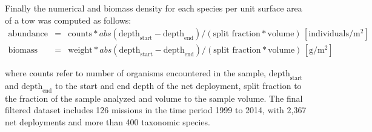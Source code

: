 \documentclass[letterpaper,portrait,11pt]{scrartcl}
\numberwithin{equation}{section}		%
\numberwithin{figure}{section}		%
\numberwithin{table}{section}				%
\begin{document}
\begin{appendices}
Finally the numerical and biomass density for each species per unit surface area of a tow was computed as follows: 
\begin{eqnarray*}
\text{abundance} &=& \text{counts} * abs( \text{depth}_{\text{start}} - \text{depth}_{\text{end}} ) / (\text{split fraction} * \text{volume}) \, [\text{individuals}/ \text{m}^{2} ]  \\
\text{biomass} &=& \text{weight} * abs( \text{depth}_{\text{start}} - \text{depth}_{\text{end}} ) / (\text{split fraction} * \text{volume}) \, [\text{g}/\text{m}^2]
\end{eqnarray*}

where counts refer to number of organisms encountered in the sample, $\text{depth}_{\text{start}}$ and $\text{depth}_{\text{end}}$ to the start and end depth of the net deployment, split fraction to the fraction of the sample analyzed and volume to the sample volume. The final filtered dataset includes 126 missions in the time period 1999 to 2014, with 2,367 net deployments and more than 400 taxonomic species. 

\end{appendices}
\end{document}
